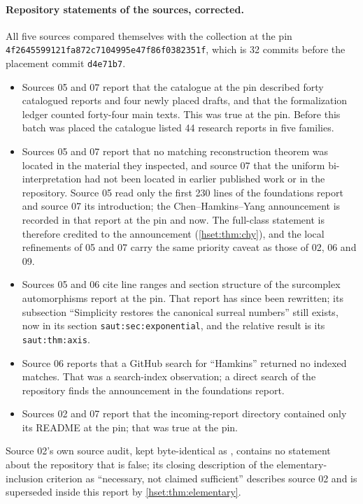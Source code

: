 \documentclass[11pt,letterpaper]{article}
\theoremstyle{definition}
\theoremstyle{remark}
\newcommand{\lbl}[1]{\nolinkurl{#1}}
\newcommand{\repoSHA}{\texttt{4f2645599121fa872c7104995e47f86f0382351f}}
\begin{document}
\paragraph{Repository statements of the sources, corrected.}
All five sources compared themselves with the collection at the pin \repoSHA,
which is 32 commits before the placement commit \texttt{d4e71b7}.
\begin{itemize}
\item Sources 05 and 07 report that the catalogue at the pin described forty
catalogued reports and four newly placed drafts, and that the formalization
ledger counted forty-four main texts. This was true at the pin. Before this
batch was placed the catalogue listed 44 research reports in five families.
\item Sources 05 and 07 report that no matching reconstruction theorem was
located in the material they inspected, and source 07 that the uniform
bi-interpretation had not been located in earlier published work or in the
repository. Source 05 read only the first 230 lines of the foundations report
and source 07 its introduction; the Chen--Hamkins--Yang announcement is recorded
in that report at the pin and now. The full-class statement is therefore
credited to the announcement (\cref{hset:thm:chy}), and the local refinements of
05 and 07 carry the same priority caveat as those of 02, 06 and 09.
\item Sources 05 and 06 cite line ranges and section structure of the
surcomplex automorphisms report at the pin. That report has since been
rewritten; its subsection ``Simplicity restores the canonical surreal numbers''
still exists, now in its section \lbl{saut:sec:exponential}, and the relative
result is its \lbl{saut:thm:axis}.
\item Source 06 reports that a GitHub search for ``Hamkins'' returned no
indexed matches. That was a search-index observation; a direct search of the
repository finds the announcement in the foundations report.
\item Sources 02 and 07 report that the incoming-report directory contained
only its README at the pin; that was true at the pin.
\end{itemize}
Source 02's own source audit, kept byte-identical as
, contains no statement about the
repository that is false; its closing description of the elementary-inclusion
criterion as ``necessary, not claimed sufficient'' describes source 02 and is
superseded inside this report by \cref{hset:thm:elementary}.
\end{document}
